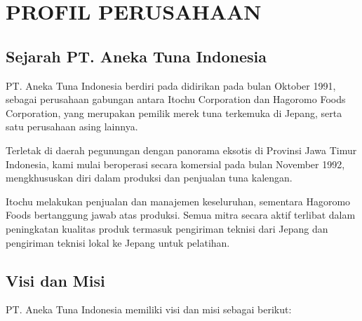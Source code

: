\chapter{PROFIL PERUSAHAAN}
\vspace{4ex}

\setlength{\parindent}{7ex}


\section{Sejarah PT. Aneka Tuna Indonesia}
\vspace{1ex}

PT. Aneka Tuna Indonesia berdiri pada didirikan pada bulan Oktober 1991, sebagai perusahaan gabungan antara Itochu 
Corporation dan Hagoromo Foods Corporation, yang merupakan pemilik merek tuna terkemuka di Jepang, serta satu 
perusahaan asing lainnya. 
\vspace{0.5ex}

Terletak di daerah pegunungan dengan panorama eksotis di Provinsi Jawa Timur Indonesia, kami mulai beroperasi secara 
komersial pada bulan November 1992, mengkhususkan diri dalam produksi dan penjualan tuna kalengan. 
\vspace{0.5ex}

Itochu melakukan penjualan dan manajemen keseluruhan, sementara Hagoromo Foods bertanggung jawab atas produksi. 
Semua mitra secara aktif terlibat dalam peningkatan kualitas produk termasuk pengiriman teknisi dari Jepang dan 
pengiriman teknisi lokal ke Jepang untuk pelatihan.
\vspace{0.5ex}

\section{Visi dan Misi}
\vspace{1ex}

PT. Aneka Tuna Indonesia memiliki visi dan misi sebagai berikut:
\vspace{0.5ex}

